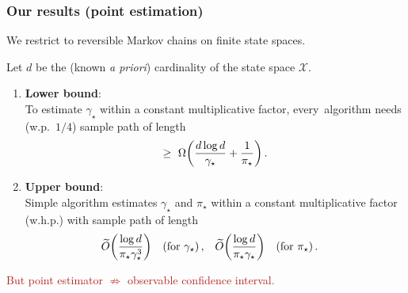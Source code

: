 \documentclass[11pt,compress,blue4,notheorem]{beamer}
\newcommand{\GREEN}[1]{\textcolor{boldgreen}{#1}}
\newcommand{\FIREBRICK}[1]{\textcolor{firebrick}{#1}}
\newcommand\fns\footnotesize
\newcommand\pimin{\ensuremath{\pi_{\star}}}
\newcommand\gap{\ensuremath{\gamma_{\star}}}
\newcommand\states{\ensuremath{\mathcal{X}}}
\begin{document}

\begin{frame}
  \frametitle{Our results (point estimation)}

  We restrict to \GREEN{reversible Markov chains} on \GREEN{finite
  state spaces}.

  Let $d$ be the (known \emph{a priori}) cardinality of the state
  space $\states$.

  \begin{enumerate}
    \item<2->
      {\fns\textbf{Lower bound}:} \\
      To estimate $\gap$ within a constant multiplicative factor,
      \mbox{every algorithm} needs (w.p.~$1/4$) sample path of
      length
      \[
        \geq \
        \Omega\Parens{
          \frac{d \log d}{\gap} + \frac1{\pimin}
        }
        \,.
      \]

    \item<3->
      {\fns\textbf{Upper bound}:} \\
      Simple algorithm estimates $\gap$ and $\pimin$ within a constant
      multiplicative factor (w.h.p.) with sample path of length
      \begin{align*}
        \wt O\Parens{ \frac{\log d}{\pimin\gap^3} }
        & \quad
        \text{(for $\gap$)}
        \,,
        &
        \wt O\Parens{ \frac{\log d}{\pimin\gap} }
        & \quad
        \text{(for $\pimin$)}
        \,.
      \end{align*}

  \end{enumerate}

  \begin{center}
    \FIREBRICK{%
      But point estimator $\not\Rightarrow$ observable
      confidence interval.
    }
  \end{center}

\end{frame}

\end{document}
